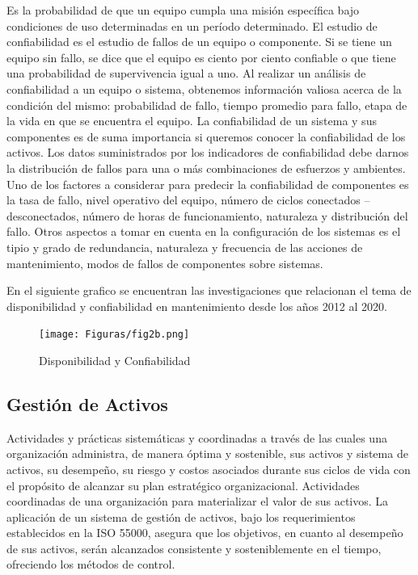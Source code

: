 \documentclass[]{article}
\begin{document}
Es la probabilidad de que un equipo cumpla una misión específica bajo condiciones de uso determinadas en un período determinado. El estudio de confiabilidad es el estudio de fallos de un equipo o componente. Si se tiene un equipo sin fallo, se dice que el equipo es ciento por ciento confiable o que tiene una probabilidad de supervivencia igual a uno. Al realizar un análisis de confiabilidad a un equipo o sistema, obtenemos información valiosa acerca de la condición del mismo: probabilidad de fallo, tiempo promedio para fallo, etapa de la vida en que se encuentra el equipo.
La confiabilidad de un sistema y sus componentes es de suma importancia si queremos conocer la confiabilidad de los activos. Los datos suministrados por los indicadores de confiabilidad debe darnos la distribución de fallos para una o más combinaciones de esfuerzos y ambientes. Uno de los factores a considerar para predecir la confiabilidad de componentes es la tasa de fallo, nivel operativo del equipo, número de ciclos conectados – desconectados, número de horas de funcionamiento, naturaleza y distribución del fallo. Otros aspectos a tomar en cuenta en la configuración de los sistemas es el tipio y grado de redundancia, naturaleza y frecuencia de las acciones de mantenimiento, modos de fallos de componentes sobre sistemas.\cite{zapata2011confiabilidad}

En el siguiente grafico se encuentran las investigaciones que relacionan el tema de disponibilidad y confiabilidad en mantenimiento desde los años 2012 al 2020.


\begin{figure}[!h]
    \centering
    \texttt{[image: Figuras/fig2b.png]}
    \caption{Disponibilidad y Confiabilidad}
    \label{fig:my_label}
\end{figure}


\subsection{Gestión de Activos}


Actividades y prácticas sistemáticas y coordinadas a través de las cuales una organización administra, de manera óptima y sostenible, sus activos y sistema de activos, su desempeño, su riesgo y costos asociados durante sus ciclos de vida con el propósito de alcanzar su plan estratégico organizacional. Actividades coordinadas de una organización para materializar el valor de sus activos.
La aplicación de un sistema de gestión de activos, bajo los requerimientos establecidos en la ISO 55000, asegura que los objetivos, en cuanto al desempeño de sus activos, serán alcanzados consistente y sosteniblemente en el tiempo, ofreciendo los métodos de control.\cite{amendola2003indicadores}
\end{document}
